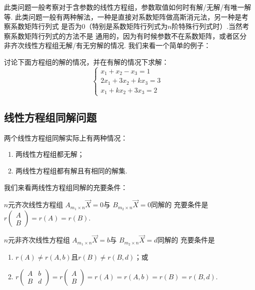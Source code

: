 此类问题一般考察对于含参数的线性方程组，参数取值如何时有解/无解/有唯一解等.
此类问题一般有两种解法，一种是直接对系数矩阵做高斯消元法，另一种是考察系数矩阵行列式
是否为0（特别是系数矩阵行列式为$n$阶特殊行列式时）.当然考察系数矩阵行列式的方法不是
通用的，因为有时候参数不在系数矩阵，或者区分非齐次线性方程组无解/有无穷解的情况.
我们来看一个简单的例子：
\begin{example}
    讨论下面方程组的解的情况，并在有解的情况下求解：\[\begin{cases}
        x_1+x_2-x_3=1 \\ 2x_1+3x_2+kx_3=3 \\ x_1+kx_2+3x_3=2
    \end{cases}\]
\end{example}
\subsection{线性方程组同解问题}
两个线性方程组同解实际上有两种情况：
\begin{enumerate}
    \item 两线性方程组都无解；

    \item 两线性方程组都有解且有相同的解集.
\end{enumerate}

我们来看两线性方程组同解的充要条件：
\begin{theorem}
    $n$元齐次线性方程组 $A_{m_1 \times n}\vec{X}=0$与 $B_{m_2 \times n}\vec{X}=0$同解的
    充要条件是$r\begin{pmatrix}
        A \\ B
    \end{pmatrix}=r(A)=r(B)$.
\end{theorem}
\begin{theorem}
    $n$元非齐次线性方程组 $A_{m_1 \times n}\vec{X}=b$与 $B_{m_2 \times n}\vec{X}=d$同解的
    充要条件是
    \begin{enumerate}
        \item $r(A)\neq r(A,b)$且$r(B)\neq r(B,d)$；或
        \item $r\begin{pmatrix}
            A & b \\ B & d
        \end{pmatrix}=r\begin{pmatrix}
            A \\ B
        \end{pmatrix}=r(A)=r(A,b)=r(B)=r(B,d)$.
    \end{enumerate}
\end{theorem}

